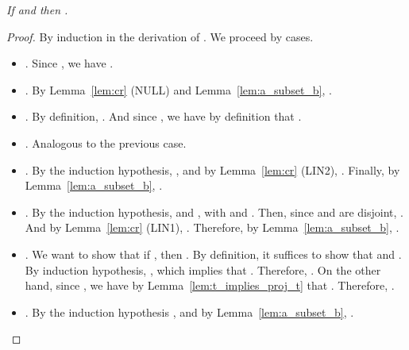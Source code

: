\documentclass[preprint]{elsarticle}
\newcommand\xrecap[4]{\noindent {\bf #1 \ref{#3} (#2).} \emph{#4}}
\begin{document}
\xrecap{Lemma}{Adequacy}{lem:adequacy}{
  If  and  then .
}
\begin{proof}
  By induction in the derivation of .
  We proceed by cases.
  \begin{itemize}
  \item . Since
    , we have .

  \item . By Lemma~\ref{lem:cr} (NULL) and Lemma~\ref{lem:a_subset_b}, .

  \item . By definition, . And since , we have by definition that .

  \item . Analogous to the previous case.

  \item . By the induction hypothesis, , and by Lemma~\ref{lem:cr} (LIN2), . Finally, by Lemma~\ref{lem:a_subset_b}, .

  \item .
    By the induction hypothesis,  and
    , with  and
    . Then, since  and  are disjoint, . And by Lemma~\ref{lem:cr} (LIN1), . Therefore, by Lemma~\ref{lem:a_subset_b}, .

  \item .
    We want to show that if , then . By definition, it suffices to show that  and .
    By induction hypothesis, , which implies that . Therefore, .
    On the other hand, since , we have by Lemma~\ref{lem:t_implies_proj_t} that .
    Therefore, .

  \item .
    By the induction hypothesis , and by
    Lemma~\ref{lem:a_subset_b}, .


\end{itemize}
\end{proof}
\end{document}
